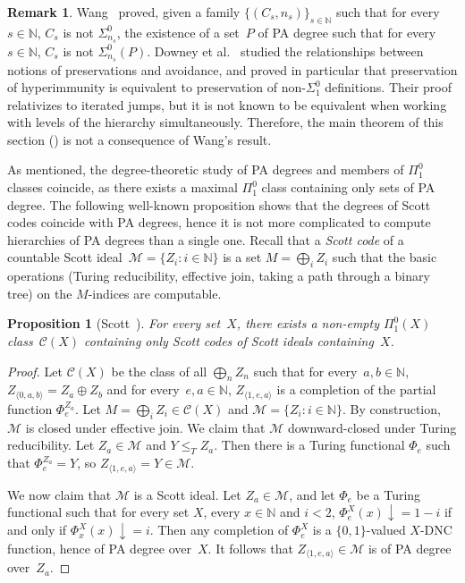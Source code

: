 \documentclass{article}
\def\NN{\mathbb{N}}
\def\C{\mathcal{C}}
\def\M{\mathcal{M}}
\newcommand{\converge}{\!\!\downarrow}
\numberwithin{theorem}{section}
\newtheorem{proposition}[theorem]{Proposition}
\theoremstyle{definition}
\newtheorem{remark}[theorem]{Remark}
\begin{document}
\begin{remark}
Wang~\cite{wang2016definability} proved, given a family $\{(C_s, n_s)\}_{s \in \NN}$ such that for every~$s \in \NN$, $C_s$ is not $\Sigma^0_{n_s}$, the existence of a set~$P$ of PA degree such that for every~$s \in \NN$, $C_s$ is not $\Sigma^0_{n_s}(P)$. Downey et al.~\cite{downey2022relationships} studied the relationships between notions of preservations and avoidance, and proved in particular that preservation of hyperimmunity is equivalent to preservation of non-$\Sigma^0_1$ definitions. Their proof relativizes to iterated jumps, but it is not known to be equivalent when working with levels of the hierarchy simultaneously. Therefore, the main theorem of this section () is not a consequence of Wang's result.
\end{remark}

As mentioned, the degree-theoretic study of PA degrees and members of $\Pi^0_1$ classes coincide, as there exists a maximal $\Pi^0_1$ class containing only sets of PA degree. The following well-known proposition shows that the degrees of Scott codes coincide with PA degrees, hence it is not more complicated to compute hierarchies of PA degrees than a single one. Recall that a \emph{Scott code} of a countable Scott ideal~$\M = \{ Z_i : i \in \NN \}$ is a set $M = \bigoplus_{i} Z_i$ such that the basic operations (Turing reducibility, effective join, taking a path through a binary tree) on the $M$-indices are computable.

\begin{proposition}[Scott~\cite{scott1962algebra}]\label{prop:pa-to-scott}
For every set~$X$, there exists a non-empty $\Pi^0_1(X)$ class~$\C(X)$ containing only Scott codes of Scott ideals containing~$X$.
\end{proposition}
\begin{proof}
Let $\C(X)$ be the class of all $\bigoplus_n Z_n$ such that for every~$a, b \in \NN$, $Z_{\langle 0, a, b\rangle} = Z_a \oplus Z_b$ and for every~$e, a \in \NN$, $Z_{\langle 1, e, a\rangle}$ is a completion of the partial function $\Phi_e^{Z_a}$. Let $M = \bigoplus_i Z_i \in \C(X)$ and $\M = \{ Z_i : i \in \NN \}$. By construction, $\M$ is closed under effective join. We claim that $\M$ downward-closed under Turing reducibility. Let $Z_a \in \M$ and $Y \leq_T Z_a$. Then there is a Turing functional $\Phi_e$ such that $\Phi_e^{Z_a} = Y$, so $Z_{\langle 1, e, a \rangle} = Y \in \M$.

We now claim that $\M$ is a Scott ideal. Let $Z_a \in \M$, and let $\Phi_e$ be a Turing functional such that for every set $X$, every $x \in \NN$ and $i < 2$, $\Phi_e^{X}(x)\converge = 1-i$ if and only if $\Phi^X_x(x)\converge = i$. Then any completion of $\Phi_e^X$ is a $\{0,1\}$-valued $X$-DNC function, hence of PA degree over~$X$. It follows that $Z_{\langle 1, e, a\rangle} \in \M$ is of PA degree over~$Z_a$.
\end{proof}
\end{document}
